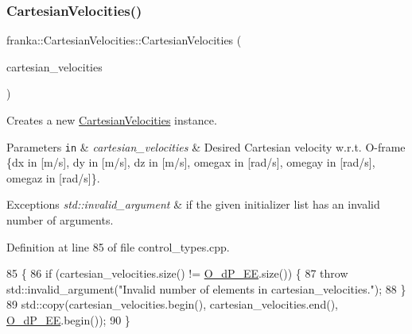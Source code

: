 \subsubsection{\texorpdfstring{Cartesian\+Velocities()}{CartesianVelocities()}\hspace{0.1cm}{\footnotesize\ttfamily [3/4]}}
{\footnotesize\ttfamily franka\+::\+Cartesian\+Velocities\+::\+Cartesian\+Velocities (\begin{DoxyParamCaption}\item[{std\+::initializer\+\_\+list$<$ double $>$}]{cartesian\+\_\+velocities }\end{DoxyParamCaption})}

Creates a new \hyperlink{classfranka_1_1CartesianVelocities}{Cartesian\+Velocities} instance.


\begin{DoxyParams}[1]{Parameters}
\mbox{\tt in}  & {\em cartesian\+\_\+velocities} & Desired Cartesian velocity w.\+r.\+t. O-\/frame \{dx in \mbox{[}m/s\mbox{]}, dy in \mbox{[}m/s\mbox{]}, dz in \mbox{[}m/s\mbox{]}, omegax in \mbox{[}rad/s\mbox{]}, omegay in \mbox{[}rad/s\mbox{]}, omegaz in \mbox{[}rad/s\mbox{]}\}.\\
\hline
\end{DoxyParams}

\begin{DoxyExceptions}{Exceptions}
{\em std\+::invalid\+\_\+argument} & if the given initializer list has an invalid number of arguments. \\
\hline
\end{DoxyExceptions}


Definition at line 85 of file control\+\_\+types.\+cpp.


\begin{DoxyCode}
85                                                                                          \{
86   \textcolor{keywordflow}{if} (cartesian\_velocities.size() != \hyperlink{classfranka_1_1CartesianVelocities_ab7a42c7c1ee7109025aff5c43a56b398}{O\_dP\_EE}.size()) \{
87     \textcolor{keywordflow}{throw} std::invalid\_argument(\textcolor{stringliteral}{"Invalid number of elements in cartesian\_velocities."});
88   \}
89   std::copy(cartesian\_velocities.begin(), cartesian\_velocities.end(), \hyperlink{classfranka_1_1CartesianVelocities_ab7a42c7c1ee7109025aff5c43a56b398}{O\_dP\_EE}.begin());
90 \}
\end{DoxyCode}
\mbox{\label{classfranka_1_1CartesianVelocities_aec434afa3f92e462ad3ab4766d3456a4}} 
